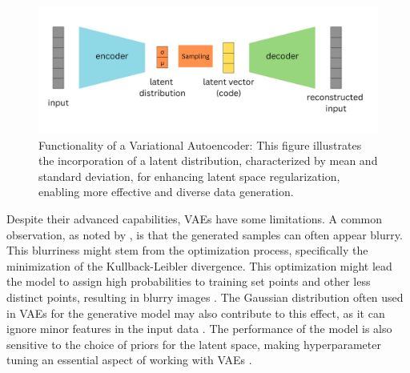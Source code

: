 \begin{figure}[ht]
    \centering
      \hspace{.8cm}
      \includegraphics[width=.9\columnwidth]{figures/VAE.png}
      \caption{Functionality of a Variational Autoencoder: This figure illustrates the incorporation of a latent distribution, characterized by mean and standard deviation, for enhancing latent space regularization, enabling more effective and diverse data generation.}\label{fig:figureVAE}
\end{figure}

Despite their advanced capabilities, VAEs have some limitations. A common observation, as noted by \citeauthor{GoodfellowDeepLearning}, is that the generated samples can often appear blurry. This blurriness might stem from the optimization process, specifically the minimization of the Kullback-Leibler divergence. This optimization might lead the model to assign high probabilities to training set points and other less distinct points, resulting in blurry images \citep{GoodfellowDeepLearning}. The Gaussian distribution often used in VAEs for the generative model may also contribute to this effect, as it can ignore minor features in the input data \citep{GoodfellowDeepLearning}. The performance of the model is also sensitive to the choice of priors for the latent space, making hyperparameter tuning an essential aspect of working with VAEs \citep{kingmaVAE, higginsVAE}.

